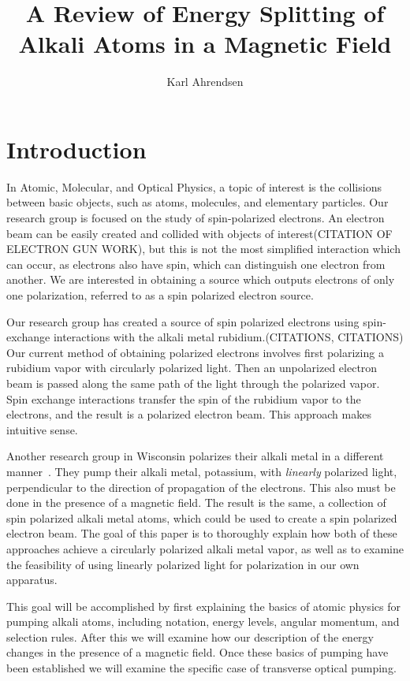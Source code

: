 \documentclass[letter,12pt]{article}
\begin{document}
\title{A Review of Energy Splitting of Alkali Atoms in a Magnetic Field}
\author{Karl Ahrendsen}
\maketitle{}

\section{Introduction}
In Atomic, Molecular,
and Optical Physics, a topic of interest is the collisions between
basic 
objects, such as atoms, molecules, and elementary particles.
Our research group is focused on the study of spin-polarized electrons. 
An electron beam can be easily created and collided
with objects of interest(CITATION OF ELECTRON GUN WORK),
but this is not the most simplified interaction
which can occur, as electrons also have spin, which can distinguish one 
electron from another. We are interested in obtaining a source which
outputs electrons of only one polarization, referred to as a spin
polarized electron source.

Our research group has created a source of spin polarized
electrons using spin-exchange interactions with the alkali metal
rubidium.(CITATIONS, CITATIONS)  Our current method of obtaining 
polarized electrons involves first polarizing a rubidium vapor
with circularly polarized light. Then an unpolarized electron beam
is passed along the same path of the light 
through the polarized vapor. Spin exchange interactions
transfer the spin of the rubidium vapor to the electrons, and the 
result is a polarized electron beam. This approach makes intuitive
sense.

Another research group in Wisconsin polarizes their alkali metal
in a different manner~\cite{swenson}. They pump their alkali metal, 
potassium, with
\emph{linearly} polarized light, perpendicular to the direction
of propagation of the electrons. This also must be done in the
presence of a magnetic field. The result is the same, a collection
of spin polarized alkali metal atoms, which could be used to create
a spin polarized electron beam. The goal of this paper is to thoroughly
explain how both of these approaches achieve a circularly polarized
alkali metal vapor, as well 
as to examine the feasibility of using linearly polarized light
for polarization in our own apparatus.

This goal will  be accomplished by first explaining the basics 
of atomic physics for pumping alkali atoms, including notation, energy
levels, angular momentum, and selection rules. After this we
will examine how our description of the energy changes in the
presence of a magnetic
field. Once these basics of pumping have been established we will
examine the specific case of transverse optical pumping. 
\end{document}
